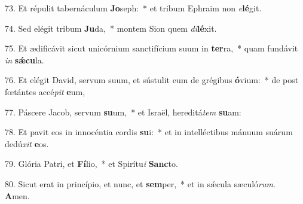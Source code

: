 73. Et répulit tabernáculum \textbf{Jo}seph:~*  et tribum Ephraim non \textit{e}\textbf{lé}git.\

74. Sed elégit tribum \textbf{Ju}da,~*  montem Sion quem \textit{di}\textbf{lé}xit.\

75. Et ædificávit sicut unicórnium sanctifícium suum in \textbf{ter}ra,~*  quam fundávit \textit{in} \textbf{sǽ}\textbf{cu}la.\

76. Et elégit David, servum suum, et sústulit eum de grégibus \textbf{ó}vium:~*  de post fœtántes accé\textit{pit} \textbf{e}um,\

77. Páscere Jacob, servum \textbf{su}um,~*  et Israël, hereditá\textit{tem} \textbf{su}am:\

78. Et pavit eos in innocéntia cordis \textbf{su}i:~*  et in intelléctibus mánuum suárum dedú\textit{xit} \textbf{e}os.\

79. Glória Patri, et \textbf{Fí}lio,~*  et Spirítu\textit{i} \textbf{Sanc}to.\

80. Sicut erat in princípio, et nunc, et \textbf{sem}per,~*  et in sǽcula sæculó\textit{rum}. \textbf{A}men.\

